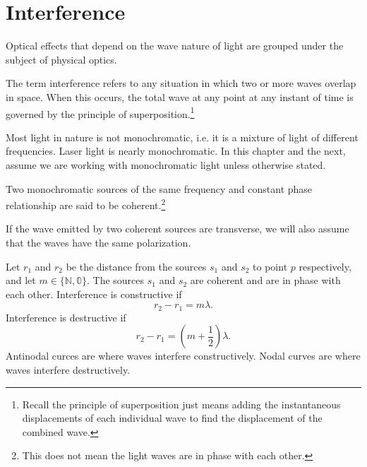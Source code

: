 \documentclass[nobib,notoc]{tufte-handout}
\begin{document}
\section{Interference}
\begin{defi}
	Optical effects that depend on the wave nature of light are grouped under the subject of physical optics.
\end{defi}
\begin{defi}[Interference]
	The term interference refers to any situation in which two or more waves overlap in space. When this occurs, the total wave at any point at any instant of time is governed by the principle of superposition.\footnote{Recall the principle of superposition just means adding the instantaneous displacements of each individual wave to find the displacement of the combined wave.}
\end{defi}
\begin{defi}
	Most light in nature is not monochromatic, i.e. it is a mixture of light of different frequencies. Laser light is nearly monochromatic. In this chapter and the next, assume we are working with monochromatic light unless otherwise stated.
\end{defi}
\begin{defi}
	Two monochromatic sources of the same frequency and constant phase relationship are said to be coherent.\footnote{This does not mean the light waves are in phase with each other.}
\end{defi}
\begin{rema}
	If the wave emitted by two coherent sources are transverse, we will also assume that the waves have the same polarization.
\end{rema}
\begin{defi}
	Let \(r_1\) and \(r_2\) be the distance from the sources \(s_1\) and \(s_2\) to point \(p\) respectively, and let \(m\in\{\mathbb{N, 0}\}\). The sources \(s_1\) and \(s_2\) are coherent and are in phase with each other. Interference is constructive if
	\begin{equation*}
		r_2-r_1=m\lambda.
	\end{equation*}
	Interference is destructive if
	\begin{equation*}
		r_2-r_1=(m+\frac{1}{2})\lambda.
	\end{equation*}
	Antinodal curces are where waves interfere constructively. Nodal curves are where waves interfere destructively.
\end{defi}
\end{document}

